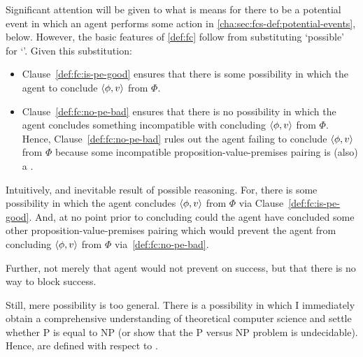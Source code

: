 \begin{note}[Intuition]
  Significant attention will be given to what is means for there to be a potential event in which an agent performs some action in \autoref{cha:sec:fcs-def:potential-events}, below.
  However, the basic features of \autoref{def:fc} follow from substituting `possible' for `\pevent{}'.
  Given this substitution:

  \begin{itemize}[noitemsep]
  \item
    Clause~\ref{def:fc:is-pe-good} ensures that there is some possibility in which the agent to conclude \(\langle \phi, v \rangle\) from \(\Phi\).
  \item
    Clause~\ref{def:fc:no-pe-bad} ensures that there is no possibility in which the agent concludes something incompatible with concluding \(\langle \phi, v \rangle\) from \(\Phi\).
    Hence, Clause~\ref{def:fc:no-pe-bad} rules out the agent failing to conclude \(\langle \phi, v \rangle\) from \(\Phi\) because some incompatible proposition-value-premises pairing is (also) a .
  \end{itemize}

  Intuitively, and inevitable result of possible reasoning.
  For, there is some possibility in which the agent concludes \(\langle \phi, v \rangle\) from \(\Phi\) via Clause~\ref{def:fc:is-pe-good}.
  And, at no point prior to concluding could the agent have concluded some other proposition-value-premises pairing which would prevent the agent from concluding \(\langle \phi, v \rangle\) from \(\Phi\) via~\ref{def:fc:no-pe-bad}.

  Further, not merely that agent would not prevent on success, but that there is no way to block success.
\end{note}

\begin{note}
  Still, mere possibility is too general.
  There is a possibility in which I immediately obtain a comprehensive understanding of theoretical computer science and settle whether P is equal to NP (or show that the P versus NP problem is undecidable).
  Hence,  are defined with respect to .
\end{note}


